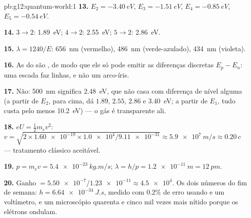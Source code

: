 \begin{solution}{pb:g12:quantum-world:1}
\textbf{13.} $E_2 = \qty{-3.40}{eV}$, $E_3 = \qty{-1.51}{eV}$,
$E_4 = \qty{-0.85}{eV}$, $E_5 = \qty{-0.54}{eV}$.

\textbf{14.} $3 \to 2$: \qty{1.89}{eV}; $4 \to 2$: \qty{2.55}{eV};
$5 \to 2$: \qty{2.86}{eV}.

\textbf{15.} $\lambda = 1240/E$: \qty{656}{nm} (vermelho),
\qty{486}{nm} (verde-azulado), \qty{434}{nm} (violeta).

\textbf{16.} As  do  são , de modo que ele só
pode emitir as diferenças discretas $E_p - E_n$: uma escada faz linhas, e
não um arco-íris.

\textbf{17.} Não: \qty{500}{nm} significa \qty{2.48}{eV}, que não casa
com diferença de nível alguma (a partir de $E_2$, para cima, dá $1.89$,
$2.55$, $2.86$ e \qty{3.40}{eV}; a partir de $E_1$, tudo custa pelo menos
\qty{10.2}{eV}) --- o gás é transparente ali.

\textbf{18.} $eU = \tfrac12 m_e v^2$:
$v = \sqrt{2 \times \num{1.60e-19} \times \num{1.0e4}/\num{9.11e-31}}
\approx \qty{5.9e7}{m/s} \approx 0.20\,c$ --- tratamento clássico
aceitável.

\textbf{19.} $p = m_e v = \qty{5.4e-23}{kg.m/s}$;
$\lambda = h/p = \qty{1.2e-11}{m} = \qty{12}{pm}$.

\textbf{20.} Ganho $= \num{5.50e-7}/\num{1.23e-11} \approx \num{4.5e4}$.
Os dois números do fim de semana: $h = \qty{6.64e-34}{J.s}$, medido com
$0.2\%$ de erro usando  e um voltímetro, e um microscópio quarenta
e cinco mil vezes mais nítido porque os elétrons ondulam.
\end{solution}
